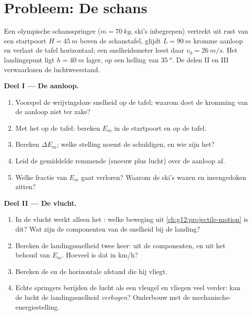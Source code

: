 \section{Probleem: De schans}

\begin{problem}
\label{pb:g12:work-and-energy:1}
Een olympische schansspringer ($m = \qty{70}{kg}$, ski's inbegrepen) vertrekt
uit rust van een startpoort $H = \qty{45}{m}$ boven de schanstafel, glijdt
$L = \qty{90}{m}$ kromme aanloop en verlaat de tafel horizontaal; een
snelheidsmeter leest daar $v_0 = \qty{26}{m/s}$. Het landingspunt ligt
$h = \qty{40}{m}$ lager, op een helling van $\qty{35}{\degree}$. De delen II
en III verwaarlozen de luchtweerstand.

\medskip\noindent\textbf{Deel I --- De aanloop.}
\begin{enumerate}
  \item Voorspel de wrijvingsloze snelheid op de tafel; waarom doet de kromming
        van de aanloop niet ter zake?
  \item Met het  op de tafel: bereken $E_m$ in de startpoort en
        op de tafel.
  \item Bereken $\Delta E_m$; welke stelling noemt de schuldigen, en wie zijn
        het?
  \item Leid de gemiddelde remmende  (sneeuw plus lucht) over de aanloop
        af.
  \item Welke fractie van $E_m$ gaat verloren? Waarom de ski's waxen en
        ineengedoken zitten?
\end{enumerate}

\medskip\noindent\textbf{Deel II --- De vlucht.}
\begin{enumerate}[resume]
  \item In de vlucht werkt alleen het : welke beweging uit
        \cref{ch:g12:projectile-motion} is dit? Wat zijn de componenten van de
        snelheid bij de landing?
  \item Bereken de landingssnelheid twee keer: uit de componenten, en uit het
        behoud van $E_m$. Hoeveel is dat in \unit{km/h}?
  \item Bereken de  en de horizontale afstand die hij vliegt.
  \item Echte springers berijden de lucht als een vleugel en vliegen veel
        verder: kan de lucht de landingssnelheid \emph{verhogen}? Onderbouw met
        de mechanische-energiestelling.
\end{enumerate}


\end{problem}
